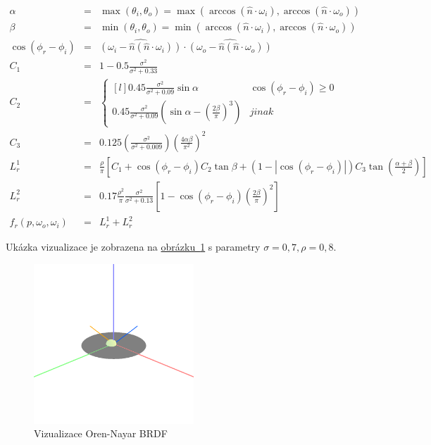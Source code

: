 \documentclass[czech,master]{diploma}
\newcommand{\uvec}[1]{\hat{#1}}
\newcommand{\point}{p}
\newcommand{\brdf}{f_r\left(\point,\omega_{o},\omega_{i}\right)}
\newcommand{\normVec}{\uvec{n}}
\newcommand{\inVec}{\omega_{i}}
\newcommand{\outVec}{\omega_{o}}
\newcommand{\alb}{\rho}
\newcommand{\rough}{\sigma}
\begin{document}
\newcommand{\cosphiri}{\cos\left(\phi_r-\phi_i\right)}

\begin{eqnarray}
  \alpha & = & \max(\theta_i , \theta_o) = \max(\arccos(\normVec\cdot\inVec), \arccos(\normVec\cdot\outVec)) \nonumber \\
  \beta & = & \min(\theta_i , \theta_o) = \min(\arccos(\normVec\cdot\inVec), \arccos(\normVec\cdot\outVec)) \nonumber \\
  \cosphiri & = & \widehat{\left( \inVec - \normVec(\normVec\cdot\inVec) \right)} \cdot \widehat{\left( \outVec - \normVec(\normVec\cdot\outVec)  \right)} \nonumber \\
  C_1 & = & 1-0.5\frac{\rough^{2}}{\rough^{2} + 0.33} \nonumber \\
  C_2 & = & \left\{\begin{matrix*}[l] 0.45\frac{\rough^{2}}{\rough^{2}+0.09}\sin\alpha & \cosphiri \geq 0\\ 0.45\frac{\rough^{2}}{\rough^2+0.09}\left(\sin\alpha-\left(\frac{2\beta}{\pi}\right)^{3}\right) & jinak \end{matrix*}\right. \nonumber \\
  C_3 & = & 0.125\left(\frac{\rough^2}{\rough^2 + 0.009}\right)\left(\frac{4\alpha\beta}{\pi^2}\right)^{2} \nonumber \\
  L^{1}_{r} & = & \frac{\alb}{\pi}\left[C_1 + \cosphiri C_2\tan\beta + \left( 1-\left | \cosphiri  \right | \right)C_3\tan \left(\frac{\alpha+\beta}{2}\right)\right] \nonumber \\
  L^{2}_{r} & = & 0.17\frac{\alb^{2}}{\pi}\frac{\rough^{2}}{\rough^2+0.13}\left[1 - \cosphiri  \left(\frac{2\beta}{\pi}\right)^{2} \right] \nonumber \\
  \brdf & = & L^{1}_{r} + L^{2}_{r} \label{eq:OrenNayar}
\end{eqnarray}

Ukázka vizualizace je zobrazena na \hyperref[fig:orenNayarBRDFRender]{obrázku~\ref{fig:orenNayarBRDFRender}} s parametry \(\rough=0{,}7, \alb = 0{,}8\).

\begin{figure}[ht]%
  \centering\includegraphics[width=6cm]{Figures/visualizations/brdfOrenNayar.png}%
  \caption{Vizualizace Oren-Nayar BRDF}%
  \label{fig:orenNayarBRDFRender}%
\end{figure}
\end{document}
